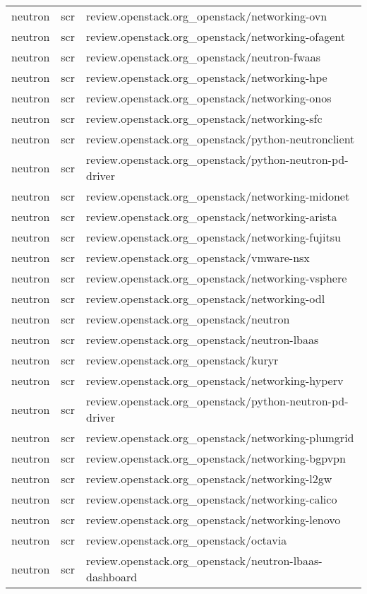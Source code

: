 \begin{center}
\begin{longtable}{|p{4cm}|p{1cm}|p{10cm}|}
neutron&scr&review.openstack.org\_openstack/networking-ovn\\ 
neutron&scr&review.openstack.org\_openstack/networking-ofagent\\ 
neutron&scr&review.openstack.org\_openstack/neutron-fwaas\\ 
neutron&scr&review.openstack.org\_openstack/networking-hpe\\ 
neutron&scr&review.openstack.org\_openstack/networking-onos\\ 
neutron&scr&review.openstack.org\_openstack/networking-sfc\\ 
neutron&scr&review.openstack.org\_openstack/python-neutronclient\\ 
neutron&scr&review.openstack.org\_openstack/python-neutron-pd-driver\\ 
neutron&scr&review.openstack.org\_openstack/networking-midonet\\ 
neutron&scr&review.openstack.org\_openstack/networking-arista\\ 
neutron&scr&review.openstack.org\_openstack/networking-fujitsu\\ 
neutron&scr&review.openstack.org\_openstack/vmware-nsx\\ 
neutron&scr&review.openstack.org\_openstack/networking-vsphere\\ 
neutron&scr&review.openstack.org\_openstack/networking-odl\\ 
neutron&scr&review.openstack.org\_openstack/neutron\\ 
neutron&scr&review.openstack.org\_openstack/neutron-lbaas\\ 
neutron&scr&review.openstack.org\_openstack/kuryr\\ 
neutron&scr&review.openstack.org\_openstack/networking-hyperv\\ 
neutron&scr&review.openstack.org\_openstack/python-neutron-pd-driver\\ 
neutron&scr&review.openstack.org\_openstack/networking-plumgrid\\ 
neutron&scr&review.openstack.org\_openstack/networking-bgpvpn\\ 
neutron&scr&review.openstack.org\_openstack/networking-l2gw\\ 
neutron&scr&review.openstack.org\_openstack/networking-calico\\ 
neutron&scr&review.openstack.org\_openstack/networking-lenovo\\ 
neutron&scr&review.openstack.org\_openstack/octavia\\ 
neutron&scr&review.openstack.org\_openstack/neutron-lbaas-dashboard\\ 

\end{longtable}
\end{center}
